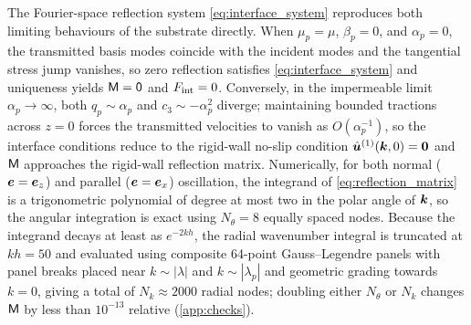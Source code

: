 The Fourier-space reflection system \cref{eq:interface_system} reproduces both limiting behaviours of the substrate
directly. When $\mu_p=\mu$, $\beta_p=0$, and $\alpha_p=0$, the transmitted basis modes coincide with the incident modes and
the tangential stress jump vanishes, so zero reflection satisfies \cref{eq:interface_system} and uniqueness yields
$\mathsf{M}=\mathsf 0$ and $F_{\rm int}=0$. Conversely, in the impermeable limit $\alpha_p\to\infty$, both $q_p\sim\alpha_p$ and
$c_3\sim-\alpha_p^2$ diverge; maintaining bounded tractions across $z=0$ forces the transmitted velocities to vanish as
$O(\alpha_p^{-1})$, so the interface conditions reduce to the rigid-wall no-slip condition $\hat{\bm{u}}^{(1)}(\bm{k},0)=\bm 0$
and $\mathsf{M}$ approaches the rigid-wall reflection matrix. Numerically, for both normal ($\bm{e}=\bm{e}_z$) and parallel
($\bm{e}=\bm{e}_x$) oscillation, the integrand of \cref{eq:reflection_matrix} is a trigonometric polynomial of degree at most
two in the polar angle of $\bm{k}$, so the angular integration is exact using $N_\theta=8$ equally spaced nodes. Because the
integrand decays at least as $e^{-2kh}$, the radial wavenumber integral is truncated at $kh=50$ and evaluated using
composite 64-point Gauss--Legendre panels with panel breaks placed near $k\sim|\lambda|$ and $k\sim|\lambda_p|$ and
geometric grading towards $k=0$, giving a total of $N_k\approx2000$ radial nodes; doubling either $N_\theta$ or $N_k$
changes $\mathsf{M}$ by less than $10^{-13}$ relative (\cref{app:checks}).

